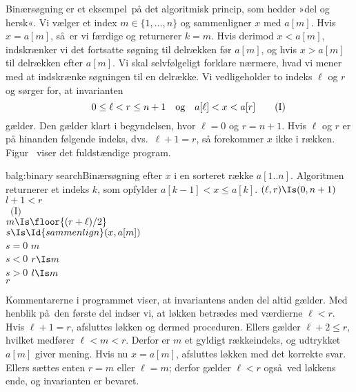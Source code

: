 Binærsøgning er et eksempel på det algoritmisk princip, som hedder »del og hersk«.
Vi vælger et index $m\in\{1,\ldots,n\}$ og sammenligner $x$ med $a[m]$.
Hvis $x = a[m]$, så er vi færdige og returnerer $k=m$. 
Hvis derimod $x < a[m]$, indskrænker vi det fortsatte søgning til delrækken før $a[m]$, og hvis $x > a[m]$ til delrækken efter $a[m]$. 
Vi skal selvfølgeligt forklare nærmere, hvad vi mener med at indskrænke søgningen til en delrække.
Vi vedligeholder to indeks $\ell$ og $r$ og sørger for, at invarianten
{\renewcommand{\theequation}{\textrm{I}}
\begin{equation}
	\qquad 0 \le \ell < r \le n+1  \quad \text{og}\quad a[\ell] < x < a[r] \tag*{$\textrm{(I)}$}
\end{equation}}
gælder.
Den gælder klart i begyndelsen, hvor $\ell = 0$ og $r = n + 1$.
Hvis $\ell$ og  $r$ er på hinanden følgende indeks, dvs.\ $\ell + 1 = r$, så forekommer $x$ ikke i rækken.
Figur~ viser det fuldstændige program.


\begin{buchalgorithmpos}{b}{alg:binary search}{Binærsøgning efter $x$ i en sorteret række $a[1..n]$.
  Algoritmen returnerer et indeks $k$, som opfylder $a[k-1] < x \le a[k]$.  
  }%
$(\ell,r) \Is(0,n+1)$ \\  
\While $l+1<r$ \Do \+ \\
    \Invariant~\emph{$\textrm{(I)}$}\\
    $m \Is \floor{(r + \ell)/2}$ \\
    $s \Is \Id{sammenlign}(x,a[m])$ \\
    \If $s = 0$  \Then \Return $m$ \\ 
    \If $s < 0$ $r \Is m$  \\
    \If $s > 0$ $l \Is m$ \- \\
    \Return $r$ 
\end{buchalgorithmpos}
%

%
Kommentarerne i programmet viser, at invariantens anden del altid gælder.
Med henblik på den første del indser vi, at løkken betrædes med værdierne 
$\ell < r$. 
Hvis $\ell + 1 = r$, afsluttes løkken og dermed proceduren. 
Ellers gælder $\ell + 2 \le r$, hvilket medfører $\ell < m < r$.
Derfor er $m$ et gyldigt rækkeindeks, og udtrykket $a[m]$ giver mening.
Hvis nu $x = a[m]$, afsluttes løkken med det korrekte svar. 
Ellers sættes enten $r = m$ eller $\ell = m$; derfor gælder $\ell < r$ også ved løkkens ende, og invarianten er bevaret.

